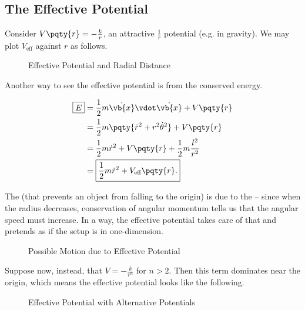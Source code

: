 \subsection{The Effective Potential}

Consider \(V\pqty{r} = - \frac{k}{r}\), an attractive \(\frac{1}{r}\) potential (e.g. in gravity). We may plot \(V_{\text{eff}}\) against \(r\) as follows.

\begin{figure}[ht!]
    \centering

    \caption{Effective Potential and Radial Distance}
    \label{fig:effective-potential}%
\end{figure}

Another way to see the effective potential is from the conserved energy.

\begin{subequations}\begin{align}
    \boxed{E} &= \frac{1}{2} m \dot{\vb{x}} \vdot \dot{\vb{x}} + V\pqty{r} \\
    &= \frac{1}{2} m \pqty{\dot{r}^2 + r^2 \dot{\theta}^2} + V\pqty{r} \\
    &= \frac{1}{2} m \dot{r}^2 + V\pqty{r} + \frac{1}{2} m \frac{l^2}{r^2} \\
    &= \boxed{\frac{1}{2} m \dot{r}^2 + V_{\text{eff}} \pqty{r}.}
\end{align}\end{subequations}

The  (that prevents an object from falling to the origin) is due to the  -- since when the radius decreases, conservation of angular momentum tells us that the angular speed must increase. In a way, the effective potential takes care of that and pretends as if the setup is in one-dimension.

\begin{figure}[ht!]
    \centering

    \caption{Possible Motion due to Effective Potential}
    \label{fig:possible-motion-effective-potential}%
\end{figure}

Suppose now, instead, that \(V = - \frac{k}{r^n}\) for \(n > 2\). Then this term dominates near the origin, which means the effective potential looks like the following.

\begin{figure}[ht!]
    \centering

    \caption{Effective Potential with Alternative Potentials}
    \label{fig:effective-potential-alternative-potential}%
\end{figure}

